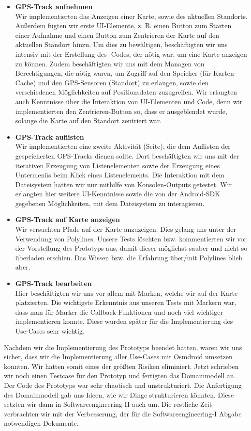 \documentclass[10pt]{article}
\begin{document}
\begin{itemize}
\item \textbf{GPS-Track aufnehmen}\\
Wir implementierten das Anzeigen einer Karte, sowie des aktuellen Standorts.
Außerdem fügten wir erste UI-Elemente, z. B. einen Button zum Starten einer Aufnahme und einen Button
zum Zentrieren der Karte auf den aktuellen Standort hinzu. Um dies zu bewältigen, beschäftigten
wir uns intensiv mit der Erstellung des -Codes, der nötig war, um eine Karte anzeigen
zu können. Zudem beschäftigten wir uns mit dem Managen von Berechtigungen,
die nötig waren, um Zugriff auf den Speicher (für Karten-Cache) und
den GPS-Sensoren (Standort) zu erlangen, sowie den verschiedenen Möglichkeiten auf Positionsdaten zuzugreifen.
Wir erlangten auch Kenntnisse über die Interaktion von UI-Elementen und Code, denn wir implementierten den
Zentrieren-Button so, dass er ausgeblendet wurde, solange die Karte auf den Standort zentriert war.
\item \textbf{GPS-Track auflisten}\\
Wir implementierten eine zweite Aktivität (Seite), die dem Auflisten der gespeicherten GPS-Tracks dienen
sollte. Dort beschäftigten wir uns mit der iterativen Erzeugung von Listenelementen sowie der Erzeugung
eines Untermenüs beim Klick eines Listenelements. Die Interaktion mit dem Dateisystem hatten wir nur mithilfe
von Konsolen-Outputs getestet. Wir erlangten hier weitere UI-Kenntnisse sowie die von der Android-SDK gegebenen
Möglichkeiten, mit dem Dateisystem zu interagieren.
\item \textbf{GPS-Track auf Karte anzeigen}\\
Wir versuchten Pfade auf der Karte anzuzeigen. Dies gelang uns unter der Verwendung von Polylines.
Unsere Tests löschten bzw. kommentierten wir vor der Vorstellung des Prototyps aus, damit dieser möglichst
sauber und nicht so überladen erschien. Das Wissen bzw. die Erfahrung über/mit Polylines blieb aber.
\item \textbf{GPS-Track bearbeiten}\\
Hier beschäftigten wir uns vor allem mit Marken, welche wir auf der Karte platzierten.
Die wichtigste Erkenntnis aus unseren Tests mit Markern war, dass man für Marker die
Callback-Funktionen  und noch viel wichtiger  implementieren konnte.
Diese wurden später für die Implementierung des Use-Cases sehr wichtig.
\end{itemize}
Nachdem wir die Implementierung des Prototyps beendet hatten, waren wir uns sicher, dass
wir die Implementierung aller Use-Cases mit Osmdroid umsetzen konnten. Wir hatten somit eines der größten Risiken eliminiert.
Jetzt schrieben wir noch einen Testcase für den Prototyp und fertigten das Domainmodell an. Der Code des Prototyps war
sehr chaotisch und unstrukturiert. Die Anfertigung des Domainmodell gab uns Ideen, wie wir Dinge strukturieren könnten.
Diese setzten wir dann in Softwareengineering-II auch um.
Die restliche Zeit verbrachten wir mit der Verbesserung,
der für die Softwareengineering-I Abgabe notwendigen Dokumente.
\end{document}
